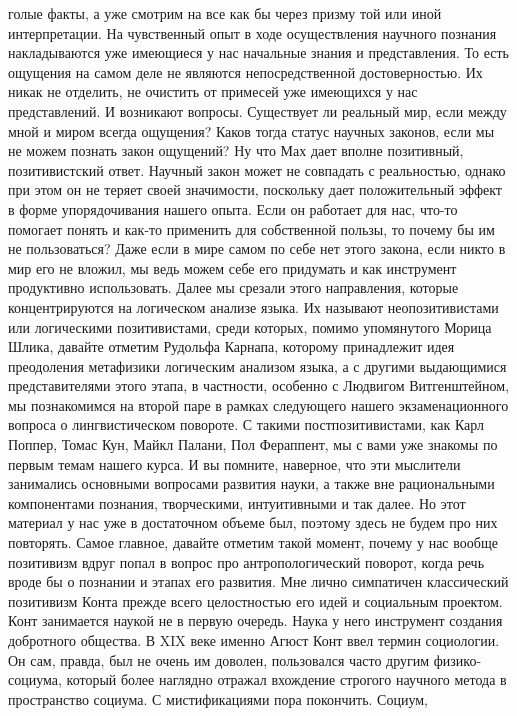голые факты, а уже смотрим на все как бы через призму той или иной
интерпретации. На чувственный опыт в ходе осуществления научного познания
накладываются уже имеющиеся у нас начальные знания и представления. То есть
ощущения на самом деле не являются непосредственной достоверностью. Их никак не
отделить, не очистить от примесей уже имеющихся у нас представлений. И возникают
вопросы. Существует ли реальный мир, если между мной и миром всегда ощущения?
Каков тогда статус научных законов, если мы не можем познать закон ощущений? Ну
что Мах дает вполне позитивный, позитивистский ответ. Научный закон может не
совпадать с реальностью, однако при этом он не теряет своей значимости,
поскольку дает положительный эффект в форме упорядочивания нашего опыта. Если он
работает для нас, что-то помогает понять и как-то применить для собственной
пользы, то почему бы им не пользоваться? Даже если в мире самом по себе нет
этого закона, если никто в мир его не вложил, мы ведь можем себе его придумать и
как инструмент продуктивно использовать. Далее мы срезали этого направления,
которые концентрируются на логическом анализе языка. Их называют
неопозитивистами или логическими позитивистами, среди которых, помимо
упомянутого Морица Шлика, давайте отметим Рудольфа Карнапа, которому принадлежит
идея преодоления метафизики логическим анализом языка, а с другими выдающимися
представителями этого этапа, в частности, особенно с Людвигом Витгенштейном, мы
познакомимся на второй паре в рамках следующего нашего экзаменационного вопроса
о лингвистическом повороте. С такими постпозитивистами, как Карл Поппер, Томас
Кун, Майкл Палани, Пол Фераппент, мы с вами уже знакомы по первым темам нашего
курса. И вы помните, наверное, что эти мыслители занимались основными вопросами
развития науки, а также вне рациональными компонентами познания, творческими,
интуитивными и так далее. Но этот материал у нас уже в достаточном объеме был,
поэтому здесь не будем про них повторять. Самое главное, давайте отметим такой
момент, почему у нас вообще позитивизм вдруг попал в вопрос про
антропологический поворот, когда речь вроде бы о познании и этапах его развития.
Мне лично симпатичен классический позитивизм Конта прежде всего целостностью его
идей и социальным проектом. Конт занимается наукой не в первую очередь. Наука у
него инструмент создания добротного общества. В XIX веке именно Агюст Конт ввел
термин социологии. Он сам, правда, был не очень им доволен, пользовался часто
другим физико-социума, который более наглядно отражал вхождение строгого
научного метода в пространство социума. С мистификациями пора покончить. Социум,
